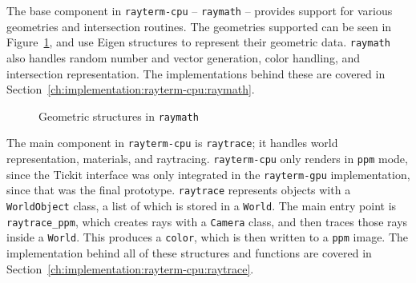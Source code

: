 The base component in \texttt{rayterm-cpu} -- \texttt{raymath} -- provides support for various geometries and intersection routines. The geometries supported can be seen in Figure~\ref{fig:rayterm-cpu-raymath-geometry}, and use Eigen structures to represent their geometric data.
\texttt{raymath} also handles random number and vector generation, color handling, and intersection representation.
The implementations behind these are covered in Section~\ref{ch:implementation:rayterm-cpu:raymath}.

\begin{figure}[htb]
  \centering
  \caption{Geometric structures in \texttt{raymath}}
  \label{fig:rayterm-cpu-raymath-geometry}
\end{figure}

The main component in \texttt{rayterm-cpu} is \texttt{raytrace}; it handles world representation, materials, and raytracing.
\texttt{rayterm-cpu} only renders in \texttt{ppm} mode, since the Tickit interface was only integrated in the \texttt{rayterm-gpu} implementation, since that was the final prototype.
\texttt{raytrace} represents objects with a \texttt{WorldObject} class, a list of which is stored in a \texttt{World}.
The main entry point is \texttt{raytrace\_ppm}, which creates rays with a \texttt{Camera} class, and then traces those rays inside a \texttt{World}.
This produces a \texttt{color}, which is then written to a \texttt{ppm} image.
The implementation behind all of these structures and functions are covered in Section~\ref{ch:implementation:rayterm-cpu:raytrace}.

